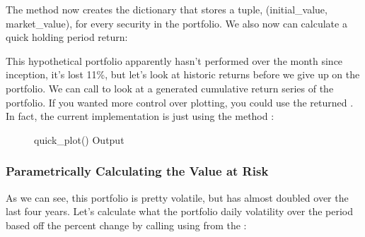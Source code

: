\documentclass[letterpaper,10pt,english]{sphinxmanual}
\begin{document}
\sphinxAtStartPar
The  method now creates the  dictionary that
stores a tuple, (initial\_value, market\_value), for every security in the
portfolio. We also now can calculate a quick holding period return:

\begin{sphinxVerbatim}[commandchars=\\\{\}]
  
\end{sphinxVerbatim}

\sphinxAtStartPar
This hypothetical portfolio apparently hasn’t performed over the month
since inception, it’s lost 11\%, but let’s look at historic returns
before we give up on the portfolio. We can call 
to look at a  generated cumulative return series of the
portfolio. If you wanted more control over plotting, you could use the
returned . In fact, the current implementation is
just using the  method :

\begin{sphinxVerbatim}[commandchars=\\\{\}]
  
\end{sphinxVerbatim}

\begin{figure}[htbp]
\centering
\capstart

\noindent{}
\caption{quick\_plot() Output}\label{\detokenize{gettingstarted:id1}}\end{figure}


\subsubsection{Parametrically Calculating the Value at Risk}
\label{\detokenize{gettingstarted:parametrically-calculating-the-value-at-risk}}
\sphinxAtStartPar
As we can see, this portfolio is pretty volatile, but has almost doubled
over the last four years. Let’s calculate what the portfolio daily
volatility over the period based off the percent change by calling
 using  from the
:
\end{document}

